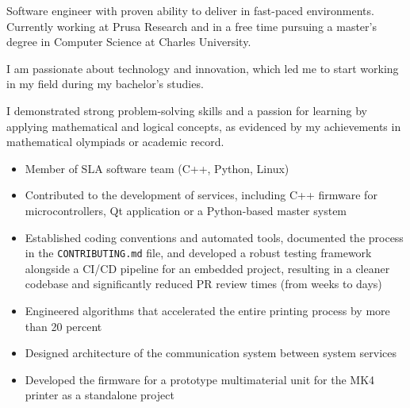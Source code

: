 \documentclass[10pt,a4paper,ragged2e]{altacv}
\begin{document}


\begin{fullwidth}
\makecvheader
\end{fullwidth}



Software engineer with proven ability to deliver in fast-paced environments. Currently working at Prusa Research and in a free time pursuing a master’s degree in Computer Science at Charles University.

\vspace{4px}

I am passionate about technology and innovation, which led me to start working in my field during my bachelor's studies.

\vspace{4px}

I demonstrated strong problem-solving skills and a passion for learning by applying mathematical and logical concepts, as evidenced by my achievements in mathematical olympiads or academic record.

\vspace{8px}



\begin{itemize}
\item Member of SLA software team (C++, Python, Linux)
\item Contributed to the development of services, including C++ firmware for microcontrollers, Qt application or a Python-based master system
\item Established coding conventions and automated tools, documented the process in the \texttt{CONTRIBUTING.md} file, and developed a robust testing framework alongside a CI/CD pipeline for an embedded project, resulting in a cleaner codebase and significantly reduced PR review times (from weeks to days)
\item Engineered algorithms that accelerated the entire printing process by more than 20 percent
\item Designed architecture of the communication system between system services
\item Developed the firmware for a prototype multimaterial unit for the MK4 printer as a standalone project
\end{itemize}
\end{document}
